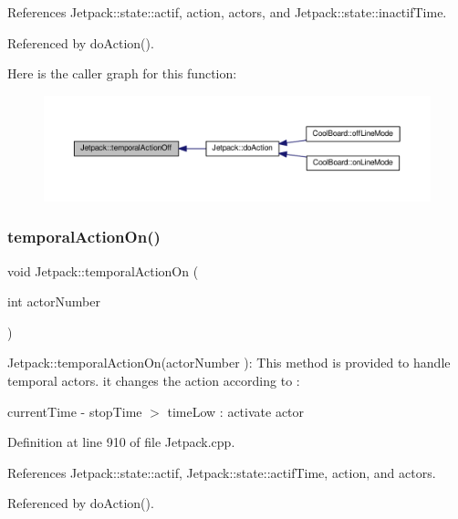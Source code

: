 References Jetpack\+::state\+::actif, action, actors, and Jetpack\+::state\+::inactif\+Time.



Referenced by do\+Action().

Here is the caller graph for this function\+:
\nopagebreak
\begin{figure}[H]
\begin{center}
\leavevmode
\includegraphics[width=350pt]{df/d1d/class_jetpack_a2991b302cd99bf89325f9b66b104d575_icgraph}
\end{center}
\end{figure}
\mbox{\label{class_jetpack_ad011d904f639accb5f94ef806846ef59}} 
\subsubsection{\texorpdfstring{temporal\+Action\+On()}{temporalActionOn()}}
{\footnotesize\ttfamily void Jetpack\+::temporal\+Action\+On (\begin{DoxyParamCaption}\item[{int}]{actor\+Number }\end{DoxyParamCaption})}

Jetpack\+::temporal\+Action\+On(actor\+Number )\+: This method is provided to handle temporal actors. it changes the action according to \+:

current\+Time -\/ stop\+Time $>$ time\+Low \+: activate actor 

Definition at line 910 of file Jetpack.\+cpp.



References Jetpack\+::state\+::actif, Jetpack\+::state\+::actif\+Time, action, and actors.



Referenced by do\+Action().

